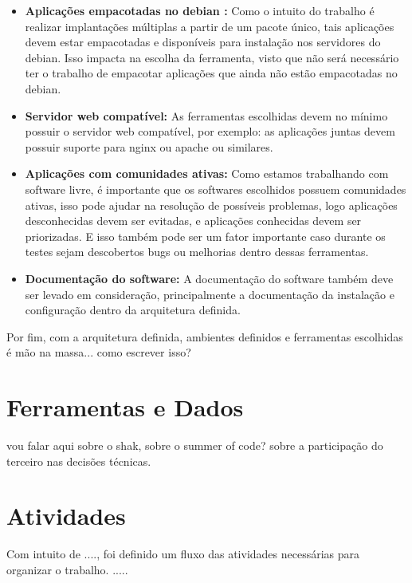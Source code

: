 \begin{itemize}
  \item  \textbf{Aplicações empacotadas no debian :}  Como o intuito do trabalho
  é realizar implantações múltiplas a partir de um pacote único, tais aplicações
  devem estar empacotadas e disponíveis para instalação nos servidores do debian.
  Isso impacta na escolha da ferramenta, visto que não será necessário ter o trabalho
  de empacotar aplicações que ainda não estão empacotadas no debian.
  \item  \textbf{Servidor web compatível:} As ferramentas escolhidas devem no
  mínimo possuir o servidor web compatível, por exemplo: as aplicações juntas
  devem possuir suporte para nginx ou apache ou similares.
  \item  \textbf{Aplicações com comunidades ativas:} Como estamos trabalhando
  com software livre, é importante que os softwares escolhidos possuem comunidades
  ativas, isso pode ajudar na resolução de  possíveis problemas, logo aplicações
  desconhecidas devem ser evitadas, e aplicações conhecidas devem ser priorizadas.
  E isso também pode ser um fator importante caso durante os testes sejam descobertos
  bugs ou melhorias dentro dessas ferramentas.
  \item  \textbf{Documentação do software:} A documentação do software também deve
  ser levado em consideração, principalmente a documentação da instalação e configuração
  dentro da arquitetura definida.
\end{itemize}

Por fim, com a arquitetura definida, ambientes definidos e ferramentas escolhidas
é mão na massa... como escrever isso?

\section{Ferramentas e Dados}

vou falar aqui sobre o shak, sobre o summer of code? sobre a participação do terceiro
nas decisões técnicas.

\section{Atividades}

Com intuito de ...., foi definido um fluxo das atividades necessárias para organizar
o trabalho. .....

%
